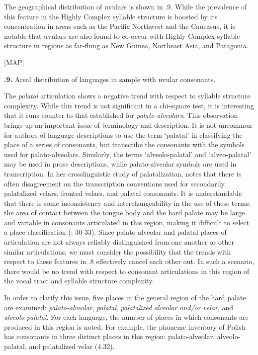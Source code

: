   The geographical distribution of uvulars is shown in .9. While the prevalence of this feature in the Highly Complex syllable structure is boosted by its concentration in areas such as the Pacific Northwest and the Caucasus, it is notable that uvulars are also found to co-occur with Highly Complex syllable structure in regions as far-flung as New Guinea, Northeast Asia, and Patagonia.

[MAP]

\textbf{.9.} Areal distribution of languages in sample with uvular consonants.

  The \textit{palatal} articulation shows a negative trend with respect to syllable structure complexity. While this trend is not significant in a chi-square test, it is interesting that it runs counter to that established for \textit{palato-alveolars}. This observation brings up an important issue of terminology and description. It is not uncommon for authors of language descriptions to use the term ‘palatal’ in classifying the place of a series of consonants, but transcribe the consonants with the symbols used for palato-alveolars. Similarly, the terms ‘alveolo-palatal’ and ‘alveo-palatal’ may be used in prose descriptions, while palato-alveolar symbols are used in transcription. In her crosslinguistic study of palatalization, \citet{Bateman2007} notes that there is often disagreement on the transcription conventions used for secondarily palatalized velars, fronted velars, and palatal consonants. It is understandable that there is some inconsistency and interchangeability in the use of these terms: the area of contact between the tongue body and the hard palate may be large and variable in consonants articulated in this region, making it difficult to select a place classification (\citealt{LadefogedMaddieson1996}: 30-33). Since palato-alveolar and palatal places of articulation are not always reliably distinguished from one another or other similar articulations, we must consider the possibility that the trends with respect to these features in .8 effectively cancel each other out. In such a scenario, there would be no trend with respect to consonant articulations in this region of the vocal tract and syllable structure complexity.

  In order to clarify this issue, five places in the general region of the hard palate are examined: \textit{palato-alveolar}, \textit{palatal}, \textit{palatalized} \textit{alveolar} \textit{and/or} \textit{velar}, and \textit{alveolo-palatal}. For each language, the number of places in which consonants are produced in this region is noted. For example, the phoneme inventory of Polish has consonants in three distinct places in this region: palato-alveolar, alveolo-palatal, and palatalized velar (4.32).

